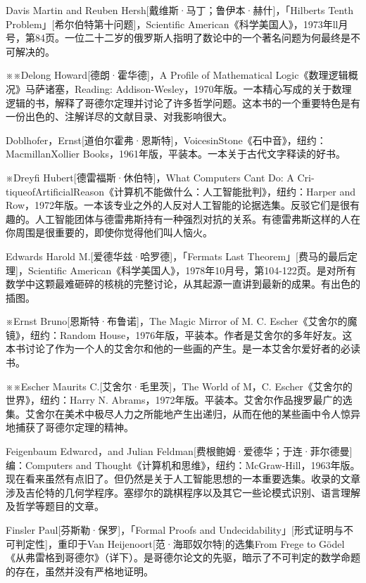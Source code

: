 \documentclass[
  12pt,
  twoside,
  openright,
  oldfontcommands,
]{memoir}
\begin{document}
Davis Martin and Reuben
Hersh{[}戴维斯·马丁；鲁伊本·赫什{]}，「Hilbert\textquotesingle s Tenth
Problem」{[}希尔伯特第十问题{]}，Scientific
American《科学美国人》，1973年ll月号，第84页。一位二十二岁的俄罗斯人指明了数论中的一个著名问题为何最终是不可解决的。

※※Delong Howard{[}德朗·霍华德{]}，A Profile of Mathematical
Logic《数理逻辑概况》马萨诸塞，Reading:
Addison-Wesley，1970年版。一本精心写成的关于数理逻辑的书，解释了哥德尔定理并讨论了许多哲学问题。这本书的一个重要特色是有一份出色的、注解详尽的文献目录、对我影响很大。

Doblhofer，Ernst{[}道伯尔霍弗·恩斯特{]}，VoicesinStone《石中音》，纽约：MacmillanXollier
Books，1961年版，平装本。一本关于古代文字释读的好书。

※Dreyfi Hubert{[}德雷福斯·休伯特{]}，What Computers
Can\textquotesingle t Do: A
Cri-tiqueofArtificialReason《计算机不能做什么：人工智能批判》，纽约：Harper
and
Row，1972年版。一本该专业之外的人反对人工智能的论据选集。反驳它们是很有趣的。人工智能团体与德雷弗斯持有一种强烈对抗的关系。有德雷弗斯这样的人在你周围是很重要的，即使你觉得他们叫人恼火。

Edwards Harold M.{[}爱德华兹·哈罗德{]}，「Fermat\textquotesingle s Last
Theorem」{[}费马的最后定理{]}，Scientific
American《科学美国人》，1978年10月号，第104-122页。是对所有数学中这颗最难砸碎的核桃的完整讨论，从其起源一直讲到最新的成果。有出色的插图。

※Ernst Bruno{[}恩斯特·布鲁诺{]}，The Magic Mirror of M. C.
Escher《艾舍尔的魔镜》，纽约：Random
House，1976年版，平装本。作者是艾舍尔的多年好友。这本书讨论了作为一个人的艾舍尔和他的一些画的产生。是一本艾舍尔爱好者的必读书。

※※Escher Maurits C.{[}艾舍尔·毛里茨{]}，The World of M，C.
Escher《艾舍尔的世界》，纽约：Harry N.
Abrams，1972年版。平装本。艾舍尔作品搜罗最广的选集。艾舍尔在美术中极尽人力之所能地产生出递归，从而在他的某些画中令人惊异地捕获了哥德尔定理的精神。

Feigenbaum Edwarcd，and Julian
Feldman{[}费根鲍姆·爱德华；于连·菲尔德曼{]}编：Computers and
Thought《计算机和思维》，纽约：McGraw-Hill，1963年版。现在看来虽然有点旧了。但仍然是关于人工智能思想的一本重要选集。收录的文章涉及吉伦特的几何学程序。塞缪尔的跳棋程序以及其它一些论模式识别、语言理解及哲学等题目的文章。

Finsler Paul{[}芬斯勒·保罗{]}，「Formal Proofs and
Undecidability」{[}形式证明与不可判定性{]}，重印于Van
Heijenoort{[}范·海耶奴尔特{]}的选集From Frege to
Gödel《从弗雷格到哥德尔》（详下）。是哥德尔论文的先驱，暗示了不可判定的数学命题的存在，虽然并没有严格地证明。
\end{document}

